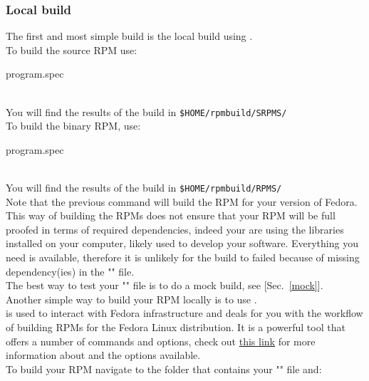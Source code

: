 \subsubsection{Local build}

The first and most simple build is the local build using . \\[0.25cm]
To build the source RPM use: 
\begin{script}
\fprompt{~}   program.spec
\end{script}
\\[-0.75cm]
\noindent You will find the results of the build in \texttt{\$HOME/rpmbuild/SRPMS/}\\[0.25cm] 
To build the binary RPM, use:
\begin{script}
\fprompt{~}   program.spec
\end{script}
\\[-0.75cm]
\noindent You will find the results of the build in \texttt{\$HOME/rpmbuild/RPMS/} \\[0.25cm]
Note that the previous command will build the RPM for your version of Fedora. \\[0.25cm]
This way of building the RPMs does not ensure that your RPM will be full proofed in terms of required dependencies, 
indeed your are using the libraries installed on your computer, likely used to develop your software. 
Everything you need is available, therefore it is unlikely for the build to failed because of missing dependency(ies) in the "" file. \\ 
The best way to test your  "" file is to do a mock build, see [Sec.~\ref{mock}]. \\[0.25cm]
\clearpage
\noindent Another simple way to build your RPM locally is to use . \\
 is used to interact with Fedora infrastructure and deals for you with the workflow of building RPMs for the Fedora Linux distribution. 
It is a powerful tool that offers a number of commands and options, check out \href{https://docs.fedoraproject.org/en-US/package-maintainers/Package\_Maintenance\_Guide/#common\_fedpkg\_commands}{this link} for more information about  and the options available. \\[0.25cm] 
To build your RPM navigate to the folder that contains your "" file and:
